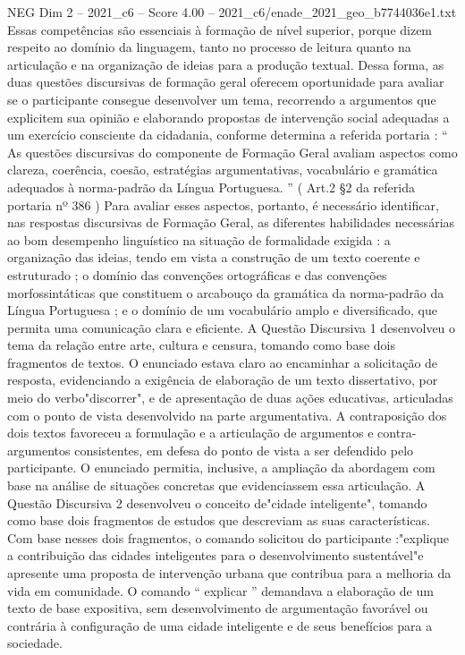 \begin{textsample}{NEG Dim 2 – 2021\_c6 – Score 4.00 – 2021\_c6/enade\_2021\_geo\_b7744036e1.txt}
Essas competências são essenciais à formação de nível superior, porque dizem respeito ao domínio da linguagem, tanto no processo de leitura quanto na articulação e na organização de ideias para a produção textual.
Dessa forma, as duas questões discursivas de formação geral oferecem oportunidade para avaliar se o participante consegue desenvolver um tema, recorrendo a argumentos que explicitem sua opinião e elaborando propostas de intervenção social adequadas a um exercício consciente da cidadania, conforme determina a referida portaria : “ As questões discursivas do componente de Formação Geral avaliam aspectos como clareza, coerência, coesão, estratégias argumentativas, vocabulário e gramática adequados à norma-padrão da Língua Portuguesa. ” ( Art.2 §2 da referida portaria nº 386 ) Para avaliar esses aspectos, portanto, é necessário identificar, nas respostas discursivas de Formação Geral, as diferentes habilidades necessárias ao bom desempenho linguístico na situação de formalidade exigida : a organização das ideias, tendo em vista a construção de um texto coerente e estruturado ; o domínio das convenções ortográficas e das convenções morfossintáticas que constituem o arcabouço da gramática da norma-padrão da Língua Portuguesa ; e o domínio de um vocabulário amplo e diversificado, que permita uma comunicação clara e eficiente.
A Questão Discursiva 1 desenvolveu o tema da relação entre arte, cultura e censura, tomando como base dois fragmentos de textos.
O enunciado estava claro ao encaminhar a solicitação de resposta, evidenciando a exigência de elaboração de um texto dissertativo, por meio do verbo"discorrer", e de apresentação de duas ações educativas, articuladas com o ponto de vista desenvolvido na parte argumentativa.
A contraposição dos dois textos favoreceu a formulação e a articulação de argumentos e contra-argumentos consistentes, em defesa do ponto de vista a ser defendido pelo participante.
O enunciado permitia, inclusive, a ampliação da abordagem com base na análise de situações concretas que evidenciassem essa articulação.
A Questão Discursiva 2 desenvolveu o conceito de"cidade inteligente", tomando como base dois fragmentos de estudos que descreviam as suas características.
Com base nesses dois fragmentos, o comando solicitou do participante :"explique a contribuição das cidades inteligentes para o desenvolvimento sustentável"e apresente uma proposta de intervenção urbana que contribua para a melhoria da vida em comunidade.
O comando “ explicar ” demandava a elaboração de um texto de base expositiva, sem desenvolvimento de argumentação favorável ou contrária à configuração de uma cidade inteligente e de seus benefícios para a sociedade.

\end{textsample}
